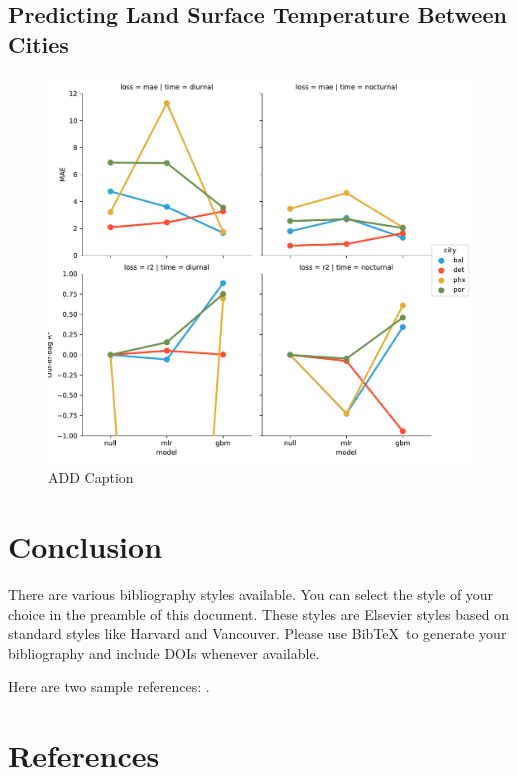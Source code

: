 \documentclass[]{elsarticle}
\begin{document}
\subsection{Predicting Land Surface Temperature Between Cities}

\begin{figure}[h]
\begin{center}
\includegraphics[width=\textwidth]{fig/report/cities_holdout.pdf}
\caption{ADD Caption}
\label{fig:cityholdout_errors}
\end{center}
\end{figure}


\section{Conclusion}

There are various bibliography styles available. You can select the style of your choice in the preamble of this document. These styles are Elsevier styles based on standard styles like Harvard and Vancouver. Please use Bib\TeX\ to generate your bibliography and include DOIs whenever available.

Here are two sample references: \cite{Feynman1963118,Dirac1953888}.

\section*{References}
\end{document}
